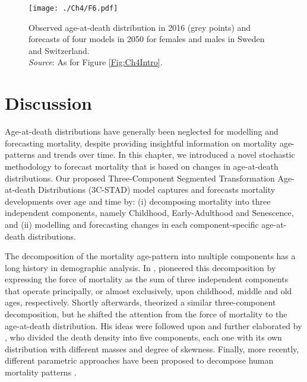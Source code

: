 \documentclass[Thesis]{subfiles}
\begin{document}
\begin{figure}[!ht]
	\begin{center}
		\texttt{[image: ./Ch4/F6.pdf]}
		\caption{Observed age-at-death distribution in 2016 (grey points) and forecasts of four models in 2050 for females and males in Sweden and Switzerland. \\\footnotesize{\textit{Source}: As for Figure \ref{Fig:Ch4Intro}.} \label{Fig:DXfore}}		
	\end{center}
\end{figure}


\section{Discussion}\label{Sec:Ch4sec4}

Age-at-death distributions have generally been neglected for modelling and forecasting mortality, despite providing insightful information on mortality age-patterns and trends over time. In this chapter, we introduced a novel stochastic methodology to forecast mortality that is based on changes in age-at-death distributions. Our proposed Three-Component Segmented Transformation Age-at-death Distributions (3C-STAD) model captures and forecasts mortality developments over age and time by: (i) decomposing mortality into three independent components, namely Childhood, Early-Adulthood and Senescence, and (ii) modelling and forecasting changes in each component-specific age-at-death distributions. 

The decomposition of the mortality age-pattern into multiple components has a long history in demographic analysis. In \citeyear{thiele1871mathematical}, \citeauthor{thiele1871mathematical} pioneered this decomposition by expressing the force of mortality as the sum of three independent components that operate principally, or almost exclusively, upon childhood, middle and old ages, respectively. Shortly afterwards, \cite{lexis1878duree} theorized a similar three-component decomposition, but he shifted the attention from the force of mortality to the age-at-death distribution. His ideas were followed upon and further elaborated by \cite{pearson1897chances}, who divided the death density into five components, each one with its own distribution with different masses and degree of skewness. Finally, more recently, different parametric approaches have been proposed to decompose human mortality patterns \citep{siler1979competing,heligman1980age,kostaki1992nine,de2016new,mazzuco2018mortality}.
\end{document}
